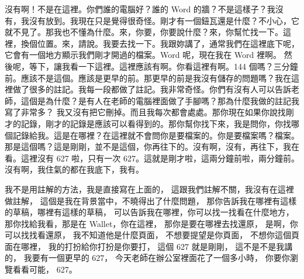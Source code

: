 \hypertarget{c11:cue:50}{}沒有啊！不是在這裡。你們誰的電腦好？誰的 Word 的牆？不是這樣子？我沒有，我沒有放到。我現在只是覺得很奇怪。剛才有一個鈕瓦還是什麼？不小心，它就不見了。那我也不懂為什麼。來，你要，你要說什麼？來，你幫忙找一下。這裡，換個位置。來，請說。我要去找一下。我跟妳講了，通常我們在這裡底下呢，它會有一個地方顯示我們剛才開過的檔案。Word 呢，現在我在 Word 裡啊。
\hypertarget{c11:cue:51}{}然後呢，等下，讓我看一下這裡。這裡應該有啊。你看這裡有啊。144 個嗎？三分鐘前。應該不是這個。應該是更早的前。那更早的前是我沒有儲存的問題嗎？我在這裡做了很多的註記。我每一段都做了註記。我非常奇怪。你們有沒有人可以告訴老師，這個是為什麼？是有人在老師的電腦裡面做了手腳嗎？那為什麼我做的註記我寫了非常多？
\hypertarget{c11:cue:52}{}我又沒有把它刪掉。而且我每次都會處處。那你現在如果你說找剛才的記錄，剛才的記錄是應該可以看得到的。那你幫你找下來，我是問你，你找哪個記錄給我。這是在哪裡？在這裡就不會問你是要檔案的。你是要檔案嗎？檔案。那是這個嗎？這是剛剛，並不是這個，你再往下的。沒有啊，沒有，再往下，我在看。這裡沒有 627 啦，只有一次 627。這就是剛才啦，這兩分鐘前啦，兩分鐘前。沒有啊，我住氣的都在我底下，我有。

\hypertarget{c11:cue:53}{}我不是用註解的方法，我是直接寫在上面的，
\hypertarget{c11:cue:54}{}這跟我們註解不關，我沒有在這裡做註解，
\hypertarget{c11:cue:55}{}這個是我在背景當中，不曉得出了什麼問題，
\hypertarget{c11:cue:56}{}那你告訴我在哪裡有這樣的草稿，哪裡有這樣的草稿，
\hypertarget{c11:cue:57}{}可以告訴我在哪裡，你可以找一找看在什麼地方，
\hypertarget{c11:cue:58}{}那你找給我看，那是在 Wallet，你在這裡，
\hypertarget{c11:cue:59}{}那你是要在哪裡去找還原，
\hypertarget{c11:cue:60}{}是啊，你可以找找看還原，
\hypertarget{c11:cue:61}{}我不知道他是什麼頁面，
\hypertarget{c11:cue:62}{}不想要提望是你頁面，
\hypertarget{c11:cue:63}{}不想你這個頁面在哪裡，
\hypertarget{c11:cue:64}{}我的打扮給你打扮是你要打，
\hypertarget{c11:cue:65}{}這個 627 就是剛剛，
\hypertarget{c11:cue:66}{}這不是不是我講的，
\hypertarget{c11:cue:67}{}我要有一個更早的 627，
\hypertarget{c11:cue:68}{}今天老師在辦公室裡面花了一個多小時，
\hypertarget{c11:cue:69}{}你要你瀏覽看看可能，
\hypertarget{c11:cue:70}{}627。

